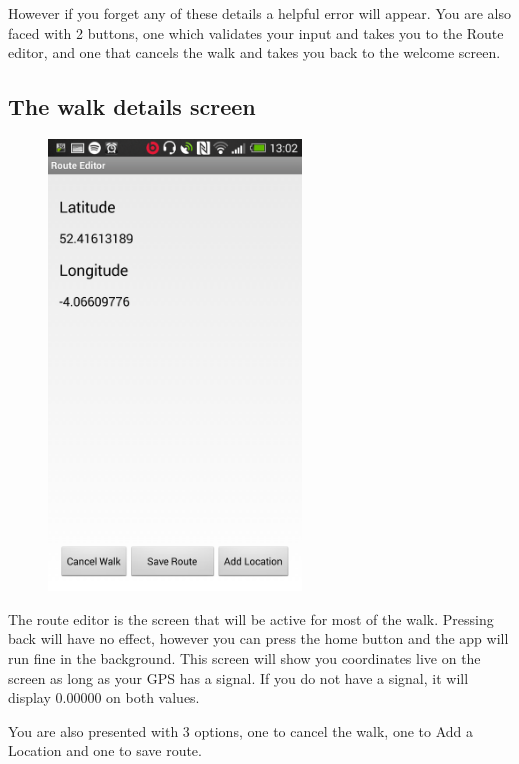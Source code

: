 \documentclass{project}
\begin{document}
However if you forget any of these details a helpful error will appear.
You are also faced with 2 buttons, one which validates your input and takes you to the Route editor, and one that cancels the walk and takes you back to the welcome screen.

\clearpage

\subsection{The walk details screen}

\begin{figure}
  \begin{center}
    \includegraphics[width=0.6\textwidth]{route}
  \end{center}
\end{figure}

The route editor is the screen that will be active for most of the walk. Pressing back will have no effect, however you can press the home button and the app will run fine in the background. This screen will show you coordinates live on the screen as long as your GPS has a signal. If you do not have a signal, it will display 0.00000 on both values. 

You are also presented with 3 options, one to cancel the walk, one to Add a Location and one to save route.
\end{document}
